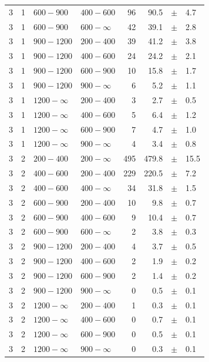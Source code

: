 \begin{table}[!h]
\begin{tabular}{rrllrrcl}
3 & 1 & $ 600- 900$ & $400-600$ &     96 &     90.5 &$\pm$&    4.7 \\
3 & 1 & $ 600- 900$ & $600-\infty$ &     42 &     39.1 &$\pm$&    2.8 \\
3\T & 1 & $ 900-1200$ & $200-400$ &     39 &     41.2 &$\pm$&    3.8 \\
3 & 1 & $ 900-1200$ & $400-600$ &     24 &     24.2 &$\pm$&    2.1 \\
3 & 1 & $ 900-1200$ & $600-900$ &     10 &     15.8 &$\pm$&    1.7 \\
3 & 1 & $ 900-1200$ & $900-\infty$ &      6 &      5.2 &$\pm$&    1.1 \\
3\T & 1 & $1200- \infty$ & $200-400$ &      3 &      2.7 &$\pm$&    0.5 \\
3 & 1 & $1200- \infty$ & $400-600$ &      5 &      6.4 &$\pm$&    1.2 \\
3 & 1 & $1200- \infty$ & $600-900$ &      7 &      4.7 &$\pm$&    1.0 \\
3 & 1 & $1200- \infty$ & $900-\infty$ &      4 &      3.4 &$\pm$&    0.8 \\
3\T & 2 & $ 200- 400$ & $200-\infty$ &    495 &    479.8 &$\pm$&   15.5 \\
3\T & 2 & $ 400- 600$ & $200-400$ &    229 &    220.5 &$\pm$&    7.2 \\
3 & 2 & $ 400- 600$ & $400-\infty$ &     34 &     31.8 &$\pm$&    1.5 \\
3\T & 2 & $ 600- 900$ & $200-400$ &     10 &      9.8 &$\pm$&    0.7 \\
3 & 2 & $ 600- 900$ & $400-600$ &      9 &     10.4 &$\pm$&    0.7 \\
3 & 2 & $ 600- 900$ & $600-\infty$ &      2 &      3.8 &$\pm$&    0.3 \\
3\T & 2 & $ 900-1200$ & $200-400$ &      4 &      3.7 &$\pm$&    0.5 \\
3 & 2 & $ 900-1200$ & $400-600$ &      2 &      1.9 &$\pm$&    0.2 \\
3 & 2 & $ 900-1200$ & $600-900$ &      2 &      1.4 &$\pm$&    0.2 \\
3 & 2 & $ 900-1200$ & $900-\infty$ &      0 &      0.5 &$\pm$&    0.1 \\
3\T & 2 & $1200- \infty$ & $200-400$ &      1 &      0.3 &$\pm$&    0.1 \\
3 & 2 & $1200- \infty$ & $400-600$ &      0 &      0.7 &$\pm$&    0.1 \\
3 & 2 & $1200- \infty$ & $600-900$ &      0 &      0.5 &$\pm$&    0.1 \\
3 & 2 & $1200- \infty$ & $900-\infty$ &      0 &      0.3 &$\pm$&    0.1 \\

\end{tabular}
\end{table}
